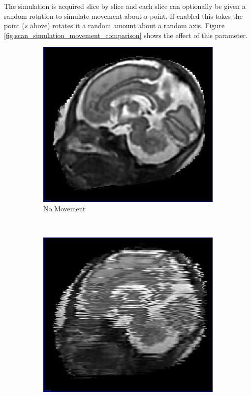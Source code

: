 The simulation is acquired slice by slice and each slice can optionally be given a random rotation to simulate movement about a point. If enabled this takes the point ($s$ above) rotates it a random amount about a random axis. Figure \ref{fig:scan_simulation_movement_comparison} shows the effect of this parameter.

\begin{figure}[H]
  \centering
  \begin{subfigure}[b]{0.32\textwidth}
    \includegraphics[width=\textwidth]{images/scan_simulation/scan_simulation_no_movement.png}
    \caption{No Movement}\label{fig:scan_simulation_no_movement}
  \end{subfigure}%
  ~ %
  \begin{subfigure}[b]{0.32\textwidth}
    \includegraphics[width=\textwidth]{images/scan_simulation/scan_simulation_5.png}

\end{subfigure}
\end{figure}
